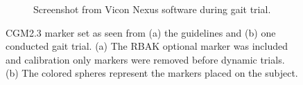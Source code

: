 \documentclass[../main.tex]{subfiles}
\begin{document}
\begin{figure}[!ht]
\begin{subfigure}[t]{0.58\textwidth}
         \label{fig:cgm23-markerset-guidelines}
     \end{subfigure}
     \hfill
     \begin{subfigure}[t]{0.40\textwidth}
         \centering
         \caption{Screenshot from Vicon Nexus software during gait trial.}
         \label{fig:cgm23-markerset-experiment-capture}
     \end{subfigure}
    \caption{CGM2.3 marker set as seen from (a) the guidelines and (b) one conducted gait trial. (a) The RBAK optional marker was included and calibration only markers were removed before dynamic trials. (b) The colored spheres represent the markers placed on the subject.}
    \label{fig:cgm23-markerset}
\end{figure}
\end{document}
